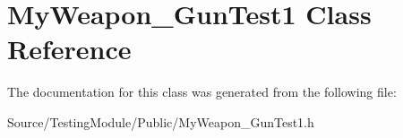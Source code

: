 \hypertarget{class_my_weapon___gun_test1}{}\section{My\+Weapon\+\_\+\+Gun\+Test1 Class Reference}
\label{class_my_weapon___gun_test1}


The documentation for this class was generated from the following file\+:\begin{DoxyCompactItemize}
\item 
Source/\+Testing\+Module/\+Public/My\+Weapon\+\_\+\+Gun\+Test1.\+h\end{DoxyCompactItemize}
